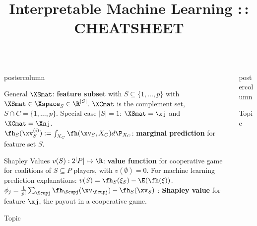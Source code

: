 \documentclass{beamer}
\title{Interpretable Machine Learning :\,: CHEATSHEET} %
\newlength{\columnheight} %
\begin{document}
\begin{frame}[fragile]{}
\vspace{-8ex}
\begin{columns}
	\begin{column}{.31\textwidth}
		\begin{beamercolorbox}[center]{postercolumn}
			\begin{minipage}{.98\textwidth}
				\parbox[t][\columnheight]{\textwidth}{
\begin{myblock}{General} \vspace{-2ex}
  $\XSmat$: \textbf{feature subset} with $S \subseteq \{1, \ldots, p\}$  with $\XSmat \in \Xspace_S \in \R^{|S|}$. $\XCmat$ is the complement set, $S \cap C = \{1, \ldots, p\}$. Special case $|S| = 1$: $\XSmat = \xj$ and $\XCmat = \Xnj$. \\

  $\fh_{S}(\xv_S^{(i)}) := \int_{X_C} \fh(\xv_S, X_C)d \P_{X_C}$: \textbf{marginal prediction} for feature set $S$. \\
\end{myblock}


\begin{myblock}{Shapley Values} \vspace{-2ex}
  $v(S): 2^|P| \mapsto \R$: \textbf{value function} for cooperative game for coalitions of $S \subseteq P$ players, with $v(\emptyset) = 0$. For machine learning prediction explanations: $v(S) =  \fh_{S} (\xi_S) - \E (\fh(\xi))$. \\

  $\phi_j = \frac{1}{p!} \sum_{\Scupj} \fh_{\Scupj}(\xv_{\Scupj}) - \fh_{S}(\xv_{S})$ : \textbf{Shapley value} for feature $\xj$, the payout in a cooperative game. \\



\end{myblock}

\begin{myblock}{Topic} 

\end{myblock}
				}
			\end{minipage}
		\end{beamercolorbox}
	\end{column}
	\begin{column}{.31\textwidth}
		\begin{beamercolorbox}[center]{postercolumn}
			\begin{minipage}{.98\textwidth}
				\parbox[t][\columnheight]{\textwidth}{
\begin{myblock}{Topic} \vspace{-4ex}


\end{myblock}}
\end{minipage}
\end{beamercolorbox}
\end{column}
\end{columns}
\end{frame}
\end{document}
